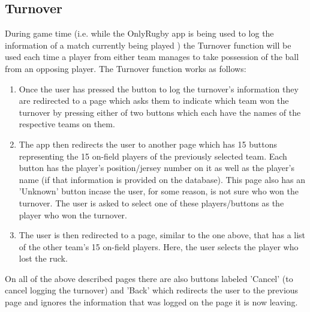 \subsection{Turnover}
		During game time (i.e. while the OnlyRugby app is being used to log the information of a match currently being played ) 
		the Turnover function will be used each time a player from either team manages to take possession of the ball from an opposing player.
		The Turnover function works as follows:
		\begin{enumerate}
			\item Once the user has pressed the button to log the turnover's information they are redirected to a page which asks them to indicate which team won the turnover by pressing either of two buttons which each
			have the names of the respective teams on them.
			\item The app then redirects the user to another page which has 15 buttons representing the 15 on-field players of the previously selected team. Each button has the player's position/jersey number on it 
			as well as the player's name (if that information is provided on the database). This page also has an 'Unknown' button incase the user, for some reason, is not sure who won the turnover. The user is asked to select one of these players/buttons as the player who won the turnover.
			\item The user is then redirected to a page, similar to the one above, that has a list of the other team's 15 on-field players. Here, the user selects the player who lost the ruck.
		\end{enumerate}
	On all of the above described pages there are also buttons labeled 'Cancel' (to cancel logging the turnover) and 'Back' which redirects the user to the previous page and ignores the information that was logged on the page it is now leaving.